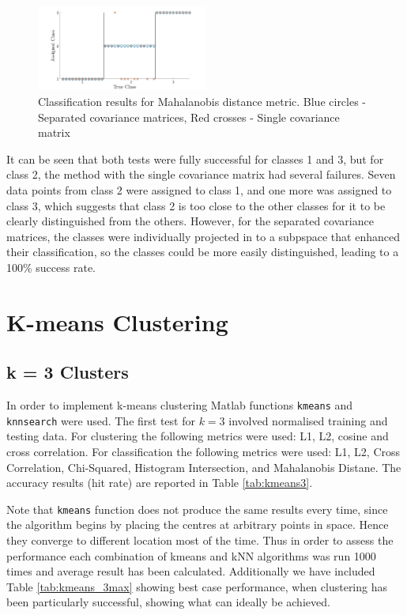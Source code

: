 \documentclass[10pt,twocolumn,letterpaper]{article}
\begin{document}
\begin{figure}
\centering
\includegraphics[width=0.5\textwidth]{../results/Q1Db_Success}
\caption{Classification results for Mahalanobis distance metric. Blue circles - Separated covariance matrices, Red crosses - Single covariance matrix
\label{fig:Mahal}}
\end{figure}

It can be seen that both tests were fully successful for classes 1 and 3, but for class 2, the method with the single covariance matrix had several failures. Seven data points from class 2 were assigned to class 1, and one more was assigned to class 3, which suggests that class 2 is too close to the other classes for it to be clearly distinguished from the others. However, for the separated covariance matrices, the classes were individually projected in to a subpspace that enhanced their classification, so the classes could be more easily distinguished, leading to a 100\% success rate.


\section{K-means Clustering}
\subsection{k = 3 Clusters}
In order to implement k-means clustering Matlab functions {\tt\small kmeans} and {\tt\small knnsearch} were used. The first test for $k=3$ involved normalised training and testing data. For clustering the following metrics were used: L1, L2, cosine and cross correlation.
For classification the following metrics were used: L1, L2, Cross Correlation, Chi-Squared, Histogram Intersection, and Mahalanobis Distane. The accuracy results (hit rate) are reported in Table \ref{tab:kmeans3}.

Note that {\tt\small kmeans} function does not produce the same results every time, since the algorithm begins by placing the centres at arbitrary points in space. Hence they converge to different location most of the time. Thus in order to assess the performance each combination of kmeans and kNN algorithms was run 1000 times and average result has been calculated. Additionally we have included Table \ref{tab:kmeans_3max} showing best case performance, when clustering has been particularly successful, showing what can ideally be achieved.
\end{document}
